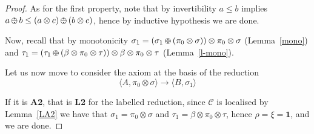 \documentclass{llncs}
\def\1{{\mathbf 1}}
\def\C{{\mathcal C}}
\def\1{{\mathbf 1}}
\def\C{{\mathcal C}}
\def\odiv{\, {\ominus\hspace{-7.7pt} \div} \,}
\begin{document}
\begin{proof}
%
As for the first property, note that by invertibility $a \leq b$ implies $a \odiv b \leq (a \otimes c) \odiv (b \otimes c)$,
hence by inductive hypothesis we are done.

Now, recall that by monotonicity 
$\sigma_1 = (\sigma_1 \odiv ( \pi_0 \otimes \sigma)) \otimes  \pi_0 \otimes \sigma$ (Lemma~\ref{mono}) and
$\tau_1 = (\tau_1 \odiv (\beta \otimes \pi_0 \otimes \tau)) \otimes \beta \otimes \pi_0 \otimes \tau$ 
(Lemma~\ref{l-mono}). 

Let us now move to consider the axiom at the basis of the reduction
$$\langle A, \pi_0 \otimes \sigma \rangle \to  \langle B, \sigma_1 \rangle$$

If it is \mbox{\bf A2}, that is \mbox{\bf L2} for the labelled reduction,
since $\C$ is localised by Lemma~\ref{LA2} we have that 
$\sigma_1 = \pi_0 \otimes \sigma$ and $\tau_1 = \beta \otimes \pi_0 \otimes \tau$,
hence $\rho = \xi = \1$, and we are done.


\end{proof}
\end{document}
